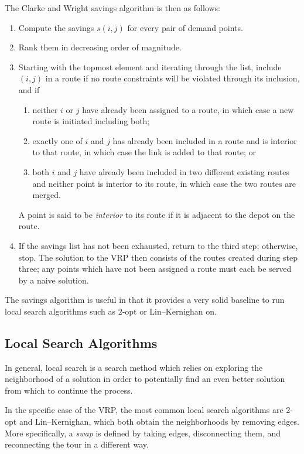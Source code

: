 \documentclass[journal]{IEEEtran}
\begin{document}
The Clarke and Wright savings algorithm is then as follows:
\begin{enumerate}
	\item Compute the savings \(s(i, j)\) for every pair of demand points.
	\item Rank them in decreasing order of magnitude.
	\item Starting with the topmost element and iterating through the list, include \((i,j)\) in a route if no route constraints will be violated through its inclusion, and if
	\begin{enumerate}[label=\alph*)]
		\item neither \(i\) or \(j\) have already been assigned to a route, in which case a new route is initiated including both;
		\item exactly one of \(i\) and \(j\) has already been included in a route and is interior to that route, in which case the link is added to that route; or
		\item both \(i\) and \(j\) have already been included in two different existing routes and neither point is interior to its route, in which case the two routes are merged.
	\end{enumerate}
	A point is said to be \emph{interior} to its route if it is adjacent to the depot on the route.
	\item If the savings list has not been exhausted, return to the third step; otherwise, stop.
	The solution to the VRP then consists of the routes created during step three; any points which have not been assigned a route must each be served by a naive solution.
\end{enumerate}

The savings algorithm is useful in that it provides a very solid baseline to run local search algorithms such as \(2\)-opt or Lin--Kernighan on.

\subsection{Local Search Algorithms}
In general, local search is a search method which relies on exploring the neighborhood of a solution in order to potentially find an even better solution from which to continue the process.

In the specific case of the VRP, the most common local search algorithms are 2-opt and Lin--Kernighan, which both obtain the neighborhoods by removing edges.
More specifically, a \emph{swap} is defined by taking edges, disconnecting them, and reconnecting the tour in a different way.
\end{document}
